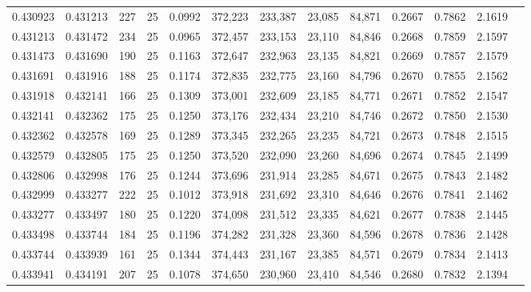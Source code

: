 \begin{tabular}{rrrrrrrrrrrrr}
0.430923 & 0.431213 &   227 &  25 &                                     0.0992 & 372,223 & 233,387 &  23,085 &  84,871 & 0.2667 & 0.7862 & 2.1619 \\
0.431213 & 0.431472 &   234 &  25 &                                     0.0965 & 372,457 & 233,153 &  23,110 &  84,846 & 0.2668 & 0.7859 & 2.1597 \\
0.431473 & 0.431690 &   190 &  25 &                                     0.1163 & 372,647 & 232,963 &  23,135 &  84,821 & 0.2669 & 0.7857 & 2.1579 \\
0.431691 & 0.431916 &   188 &  25 &                                     0.1174 & 372,835 & 232,775 &  23,160 &  84,796 & 0.2670 & 0.7855 & 2.1562 \\
0.431918 & 0.432141 &   166 &  25 &                                     0.1309 & 373,001 & 232,609 &  23,185 &  84,771 & 0.2671 & 0.7852 & 2.1547 \\
0.432141 & 0.432362 &   175 &  25 &                                     0.1250 & 373,176 & 232,434 &  23,210 &  84,746 & 0.2672 & 0.7850 & 2.1530 \\
0.432362 & 0.432578 &   169 &  25 &                                     0.1289 & 373,345 & 232,265 &  23,235 &  84,721 & 0.2673 & 0.7848 & 2.1515 \\
0.432579 & 0.432805 &   175 &  25 &                                     0.1250 & 373,520 & 232,090 &  23,260 &  84,696 & 0.2674 & 0.7845 & 2.1499 \\
0.432806 & 0.432998 &   176 &  25 &                                     0.1244 & 373,696 & 231,914 &  23,285 &  84,671 & 0.2675 & 0.7843 & 2.1482 \\
0.432999 & 0.433277 &   222 &  25 &                                     0.1012 & 373,918 & 231,692 &  23,310 &  84,646 & 0.2676 & 0.7841 & 2.1462 \\
0.433277 & 0.433497 &   180 &  25 &                                     0.1220 & 374,098 & 231,512 &  23,335 &  84,621 & 0.2677 & 0.7838 & 2.1445 \\
0.433498 & 0.433744 &   184 &  25 &                                     0.1196 & 374,282 & 231,328 &  23,360 &  84,596 & 0.2678 & 0.7836 & 2.1428 \\
0.433744 & 0.433939 &   161 &  25 &                                     0.1344 & 374,443 & 231,167 &  23,385 &  84,571 & 0.2679 & 0.7834 & 2.1413 \\
0.433941 & 0.434191 &   207 &  25 &                                     0.1078 & 374,650 & 230,960 &  23,410 &  84,546 & 0.2680 & 0.7832 & 2.1394 \\

\end{tabular}

